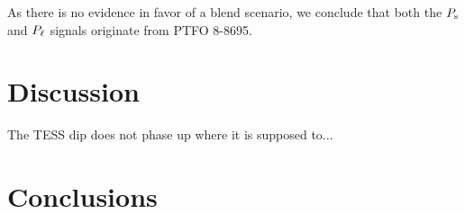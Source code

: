 \documentclass[12pt,twocolumn,tighten]{aastex62}
\begin{document}
As there is no evidence in favor of a blend scenario, we
conclude that both the $P_{\rm s}$ and $P_{\rm \ell}$ signals originate from PTFO 8-8695.

\section{Discussion}
\label{sec:discussion}

The TESS dip does not phase up where it is supposed to...
\label{fig:o_minus_c}

\section{Conclusions}
\label{sec:conclusions}



\end{document}

